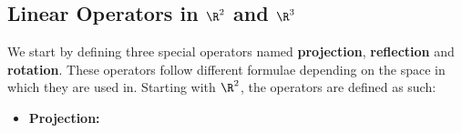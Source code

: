 \documentclass[a4paper]{article}
\begin{document}
  \subsection[Linear Operators]{Linear Operators in $\R^2$ and $\R^3$}
  We start by defining three special operators named \textbf{projection}, \textbf{reflection} and \textbf{rotation}. These operators follow different formulae depending on the space in which they are used in. Starting with $\R^2$, the operators are defined as such:
  \begin{itemize}
    \item \textbf{Projection:}
\end{itemize}
\end{document}
